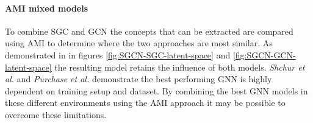 \paragraph{AMI mixed models}
To combine SGC and GCN the concepts that can be extracted are compared using AMI to determine where the two approaches are most similar.
As demonstrated in  in figures \ref{fig:SGCN-SGC-latent-space} and \ref{fig:SGCN-GCN-latent-space} the resulting model retains the influence of both models.
\textit{Shchur et al.}\cite{shchur2018pitfalls} and \textit{Purchase et al.} demonstrate the best performing GNN is highly dependent on training setup and dataset.
By combining the best GNN models in these different environments using the AMI approach it may be possible to overcome these limitations.
